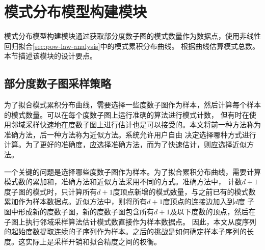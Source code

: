 \documentclass[master]{thesis-uestc}
\begin{document}
\section{模式分布模型构建模块}
\label{sec:fitting-module}
    模式分布模型构建模块通过获取部分度数子图的模式数量作为数据点，使用非线性回归拟合\ref{sec:pow-law-analysis}中的模式累积分布曲线。
根据曲线估算模式总数。本节描述该模块的设计要点。

\subsection{部分度数子图采样策略}
\label{subsec:deg-sub-samp}
    为了拟合模式累积分布曲线，需要选择一些度数子图作为样本，然后计算每个样本的模式数量。可以在每个度数子图上运行准确的算法进行模式计数，
但有时在使用邻域采样快速地在度数子图上进行估计也是可以接受的。本文将前一种方法称为准确方法，后一种方法称为近似方法。系统允许用户自由
决定选择哪种方式进行计算。为了更好的准确度，应选择准确方法，而为了快速估计，则应选择近似方法。

    一个关键的问题是选择哪些度数子图作为样本。为了拟合累积分布曲线，需要计算模式数的累加和，准确方法和近似方法采用不同的方式。准确方法中，
计数$d+1$度子图的模式时，只计算所有$d+1$度顶点新增的模式数量，与之前已有的模式数累加作为样本数据点。近似方法中，则将所有$d+1$度顶点的连接边加入到$d$度
子图中形成新的度数子图，新的度数子图包含所有$d+1$及以下度数的顶点，然后在子图上执行邻域采样算法估计模式数直接作为样本数据点。
因此，本文从度序列的起始度数提取连续的子序列作为样本。之后的挑战是如何确定样本子序列的长度。这实际上是采样开销和拟合精度之间的权衡。
\end{document}
